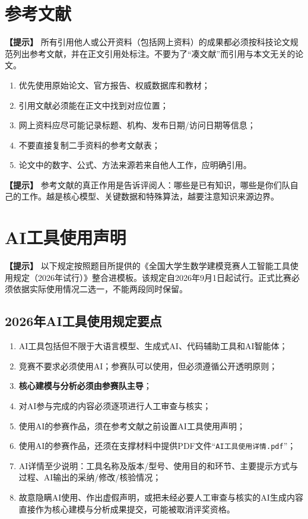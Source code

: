 \documentclass[12pt,a4paper]{article}
\newcommand{\tip}[1]{\par\noindent\textbf{【提示】} #1\par}
\begin{document}
\section{参考文献}

\tip{所有引用他人或公开资料（包括网上资料）的成果都必须按科技论文规范列出参考文献，并在正文引用处标注。不要为了“凑文献”而引用与本文无关的论文。}

\begin{enumerate}
  \item 优先使用原始论文、官方报告、权威数据库和教材；
  \item 引用文献必须能在正文中找到对应位置；
  \item 网上资料应尽可能记录标题、机构、发布日期/访问日期等信息；
  \item 不要直接复制二手资料的参考文献表；
  \item 论文中的数字、公式、方法来源若来自他人工作，应明确引用。
\end{enumerate}

\tip{参考文献的真正作用是告诉评阅人：哪些是已有知识，哪些是你们队自己的工作。越是核心模型、关键数据和特殊算法，越要注意知识来源边界。}

\section*{AI工具使用声明}

\tip{以下规定按照题目所提供的《全国大学生数学建模竞赛人工智能工具使用规定（2026年试行）》整合进模板。该规定自2026年9月1日起试行。正式比赛必须依据实际使用情况二选一，不能两段同时保留。}

\subsection*{2026年AI工具使用规定要点}
\begin{enumerate}
  \item AI工具包括但不限于大语言模型、生成式AI、代码辅助工具和AI智能体；
  \item 竞赛不要求必须使用AI；参赛队可以使用，但必须遵循公开透明原则；
  \item \textbf{核心建模与分析必须由参赛队主导}；
  \item 对AI参与完成的内容必须逐项进行人工审查与核实；
  \item 使用AI的参赛作品，须在参考文献之前设置AI工具使用声明；
  \item 使用AI的参赛作品，还须在支撑材料中提供PDF文件“\texttt{AI工具使用详情.pdf}”；
  \item AI详情至少说明：工具名称及版本/型号、使用目的和环节、主要提示方式与过程、AI输出的采纳/修改/核验情况；
  \item 故意隐瞒AI使用、作出虚假声明，或把未经必要人工审查与核实的AI生成内容直接作为核心建模与分析成果提交，可能被取消评奖资格。
\end{enumerate}
\end{document}
